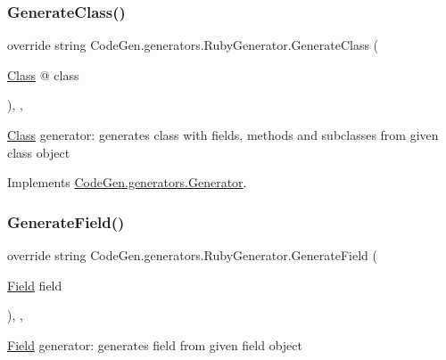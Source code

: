 \subsubsection{\texorpdfstring{Generate\+Class()}{GenerateClass()}}
{\footnotesize\ttfamily override string Code\+Gen.\+generators.\+Ruby\+Generator.\+Generate\+Class (\begin{DoxyParamCaption}\item[{\mbox{\hyperlink{classCodeGen_1_1generators_1_1Class}{Class}} @}]{class }\end{DoxyParamCaption})\hspace{0.3cm}{\ttfamily [inline]}, {\ttfamily [protected]}, {\ttfamily [virtual]}}



\mbox{\hyperlink{classCodeGen_1_1generators_1_1Class}{Class}} generator\+: generates class with fields, methods and subclasses from given class object  



Implements \mbox{\hyperlink{classCodeGen_1_1generators_1_1Generator_a8847fd8b6d408a0dfc087dcc1dc58340}{Code\+Gen.\+generators.\+Generator}}.

\mbox{\label{classCodeGen_1_1generators_1_1RubyGenerator_a08fbd6d88c129901aa159e3a9a706278}} 
\subsubsection{\texorpdfstring{Generate\+Field()}{GenerateField()}}
{\footnotesize\ttfamily override string Code\+Gen.\+generators.\+Ruby\+Generator.\+Generate\+Field (\begin{DoxyParamCaption}\item[{\mbox{\hyperlink{classCodeGen_1_1generators_1_1Field}{Field}}}]{field }\end{DoxyParamCaption})\hspace{0.3cm}{\ttfamily [inline]}, {\ttfamily [protected]}, {\ttfamily [virtual]}}



\mbox{\hyperlink{classCodeGen_1_1generators_1_1Field}{Field}} generator\+: generates field from given field object  



